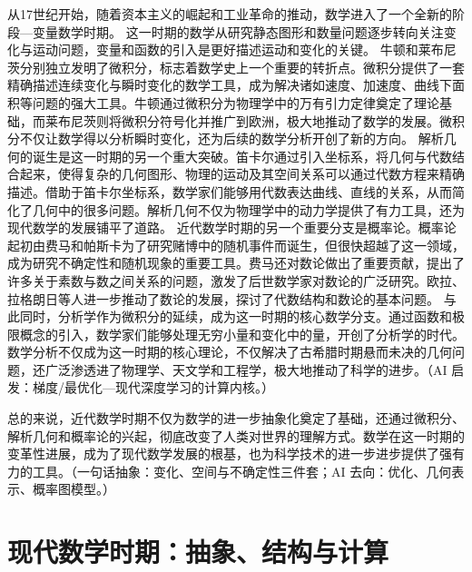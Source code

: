 从17世纪开始，随着资本主义的崛起和工业革命的推动，数学进入了一个全新的阶段---变量数学时期。
这一时期的数学从研究静态图形和数量问题逐步转向关注变化与运动问题，变量和函数的引入是更好描述运动和变化的关键。
牛顿和莱布尼茨分别独立发明了微积分，标志着数学史上一个重要的转折点。微积分提供了一套精确描述连续变化与瞬时变化的数学工具，成为解决诸如速度、加速度、曲线下面积等问题的强大工具。牛顿通过微积分为物理学中的万有引力定律奠定了理论基础，而莱布尼茨则将微积分符号化并推广到欧洲，极大地推动了数学的发展。微积分不仅让数学得以分析瞬时变化，还为后续的数学分析开创了新的方向。
解析几何的诞生是这一时期的另一个重大突破。笛卡尔通过引入坐标系，将几何与代数结合起来，使得复杂的几何图形、物理的运动及其空间关系可以通过代数方程来精确描述。借助于笛卡尔坐标系，数学家们能够用代数表达曲线、直线的关系，从而简化了几何中的很多问题。解析几何不仅为物理学中的动力学提供了有力工具，还为现代数学的发展铺平了道路。
近代数学时期的另一个重要分支是概率论。概率论起初由费马和帕斯卡为了研究赌博中的随机事件而诞生，但很快超越了这一领域，成为研究不确定性和随机现象的重要工具。费马还对数论做出了重要贡献，提出了许多关于素数与数之间关系的问题，激发了后世数学家对数论的广泛研究。欧拉、拉格朗日等人进一步推动了数论的发展，探讨了代数结构和数论的基本问题。
与此同时，分析学作为微积分的延续，成为这一时期的核心数学分支。通过函数和极限概念的引入，数学家们能够处理无穷小量和变化中的量，开创了分析学的时代。数学分析不仅成为这一时期的核心理论，不仅解决了古希腊时期悬而未决的几何问题，还广泛渗透进了物理学、天文学和工程学，极大地推动了科学的进步。{（AI 启发：梯度/最优化—现代深度学习的计算内核。）}


总的来说，近代数学时期不仅为数学的进一步抽象化奠定了基础，还通过微积分、解析几何和概率论的兴起，彻底改变了人类对世界的理解方式。数学在这一时期的变革性进展，成为了现代数学发展的根基，也为科学技术的进一步进步提供了强有力的工具。{（一句话抽象：变化、空间与不确定性三件套；AI 去向：优化、几何表示、概率图模型。）}
\section{现代数学时期：抽象、结构与计算}


